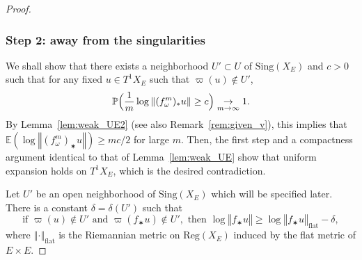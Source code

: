 \documentclass[11pt]{article}
\newcommand{\norm}[1]{{\left\Vert#1\right\Vert}}
\newcommand{\unsur}[1]{\frac{1}{#1}}
\newcommand{\lrpar}[1]{\left(#1\right)}
\newcommand{\Blrpar}[1]{\Bigl(#1\Bigr)}
\newcommand{\ee}{\mathbb{E}}
\newcommand{\pp}{\mathbb{P}}\let\P\pp
\newcommand{\Sing}{{\mathrm{Sing}}}
\theoremstyle{plain}
\theoremstyle{definition}
\numberwithin{equation}{section}
\begin{document}
\begin{proof}
\subsubsection*{Step 2: away from the singularities}
We shall show that there exists a neighborhood $U'\subset U$ of $\Sing(X_E)$
and $c>0$ such that
for any fixed $u\in T^1X_E$ such that $\varpi(u)\notin U'$,
\begin{equation}\label{eq:UE_proba}
\pp\Blrpar{\unsur{m}\log \norm{(f_\omega^m)_\varstar u} \geq c} \underset{m\to\infty}{\to} 1.
\end{equation}
By Lemma~\ref{lem:weak_UE2} (see also Remark~\ref{rem:given_v}), this implies that
$\ee\lrpar{\log \norm{(f_\omega^m)_\varstar u}}\geq mc/2$ for large $m$. Then, the first step and
a compactness argument identical to that of
Lemma~\ref{lem:weak_UE} show that uniform expansion holds on $T^1X_E$,
which is the desired contradiction.

Let $U'$ be an open neighborhood of $\Sing(X_E)$ which will be specified later.
There is a constant $\delta = \delta(U')$ such that
\begin{equation}\label{eq:flat1}
\text{if } \varpi(u)\notin U'\text{ and } \varpi(f_\varstar u)\notin U', \text{ then }
\log\norm{f_\varstar u} \geq \log\norm{f_\varstar u}_{\mathrm{flat}} - \delta,
\end{equation}
where $\norm{\cdot}_{\mathrm{flat}}$ is the Riemannian metric on $\mathrm{Reg}(X_E)$ induced by the flat metric of
$E\times E$.


\end{proof}
\end{document}

